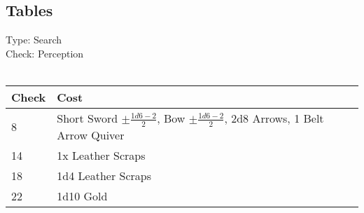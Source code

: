 \subsection{Tables}
Type: Search\\
Check: Perception\\
\\
\begin{minipage}{0.8\textwidth}
	\begin{tabular}{|l | p{11cm}|}
		\hline
		Check & Cost\\
		\hline
		8 & Short Sword $\pm \frac{1d6 - 2}{2}$, Bow $\pm \frac{1d6 - 2}{2}$, 2d8 Arrows, 1 Belt Arrow Quiver\\
		14 & 1x Leather Scraps\\
		18 & 1d4 Leather Scraps\\
		22 & 1d10 Gold\\
		\hline
	\end{tabular}
\end{minipage}
\pagebreak